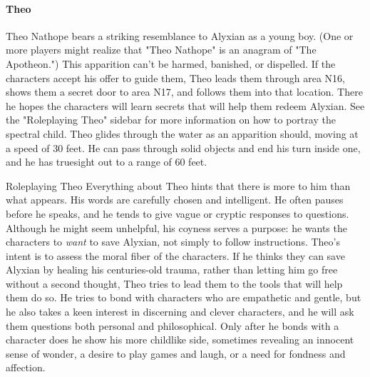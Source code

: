 \documentclass[10pt,a4,twoside,twocolumn,openany,nodeprecatedcode]{dndbook}
\begin{document}
\paragraph{Theo}
Theo Nathope bears a striking resemblance to Alyxian as a young boy. (One or more players might realize that "Theo Nathope" is an anagram of "The Apotheon.") This apparition can't be harmed, banished, or dispelled. If the characters accept his offer to guide them, Theo leads them through area N16, shows them a secret door to area N17, and follows them into that location. There he hopes the characters will learn secrets that will help them redeem Alyxian. See the "Roleplaying Theo" sidebar for more information on how to portray the spectral child.
Theo glides through the water as an apparition should, moving at a speed of 30 feet. He can pass through solid objects and end his turn inside one, and he has truesight out to a range of 60 feet.
\begin{DndComment}{Roleplaying Theo}
Everything about Theo hints that there is more to him than what appears. His words are carefully chosen and intelligent. He often pauses before he speaks, and he tends to give vague or cryptic responses to questions. Although he might seem unhelpful, his coyness serves a purpose: he wants the characters to \textit{want} to save Alyxian, not simply to follow instructions.
Theo's intent is to assess the moral fiber of the characters. If he thinks they can save Alyxian by healing his centuries-old trauma, rather than letting him go free without a second thought, Theo tries to lead them to the tools that will help them do so. He tries to bond with characters who are empathetic and gentle, but he also takes a keen interest in discerning and clever characters, and he will ask them questions both personal and philosophical. Only after he bonds with a character does he show his more childlike side, sometimes revealing an innocent sense of wonder, a desire to play games and laugh, or a need for fondness and affection.
\end{DndComment}
\end{document}
